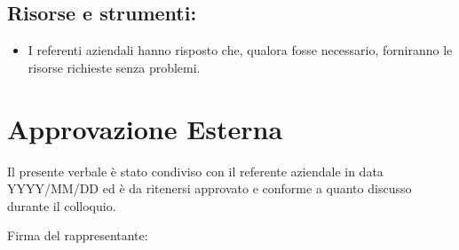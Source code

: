 \documentclass[a4paper, 11pt]{article}
\begin{document}
\subsection{Risorse e strumenti:}
\begin{itemize}
    \item I referenti aziendali hanno risposto che, qualora fosse necessario, forniranno le risorse richieste senza problemi. \vspace{-0.1cm}
\end{itemize}
\newpage


\section{Approvazione Esterna}

Il presente verbale è stato condiviso con il referente aziendale in data YYYY/MM/DD ed è da ritenersi approvato e conforme a quanto discusso durante il colloquio. 

\vspace{3cm}
Firma del rappresentante:
\end{document}
